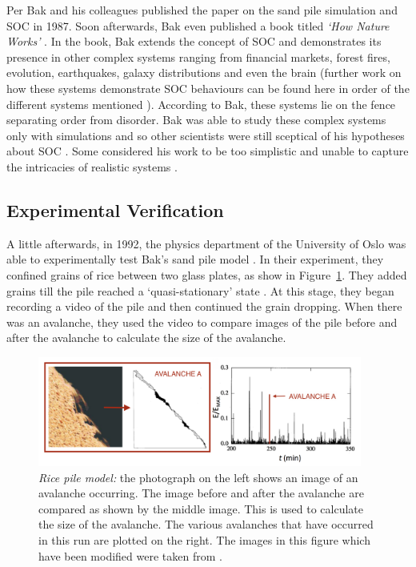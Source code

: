 \documentclass{book}
\begin{document}
Per Bak and his colleagues published the paper on the sand pile simulation and SOC in 1987. Soon afterwards, Bak even published a book titled \textit{`How Nature Works'} \cite{howNatureWorks}. In the book, Bak extends the concept of SOC and demonstrates its presence in other complex systems ranging from financial markets,  forest fires, evolution, earthquakes, galaxy distributions and even the brain \cite{howNatureWorks} (further work on how these systems demonstrate SOC behaviours can be found here in order of the different systems mentioned \cite{stockMarketProof, ForestFireProof,evolutionProof,EarthquakesProof,galaxyFormationProof,BrainProof}). According to Bak, these systems lie on the fence separating order from disorder. Bak was able to study these complex systems only with simulations and so other scientists were still sceptical of his hypotheses about SOC \cite{MindSandWeb}. Some considered his work to be too simplistic and unable to capture the intricacies of realistic systems \cite{MindSandWeb}. 
\subsection{Experimental Verification}
A little afterwards, in 1992, the physics department of the University of Oslo was able to experimentally test Bak's sand pile model \cite{riceExpt}. In their experiment, they confined grains of rice between two glass plates, as show in Figure~\ref{fig:riceModel}. They added grains till the pile reached a `quasi-stationary' state \cite{riceExpt}. At this stage, they began recording a video of the pile and then continued the grain dropping. When there was an avalanche, they used the video to compare images of the pile before and after the avalanche to calculate the size of the avalanche. 
\begin{figure}[h]
	\centering
	\includegraphics[width=0.95\textwidth]{Figures/Intro/riceFigs/riceEvent}
	\caption[Rice-pile Model]{
\textit{Rice pile model:} the photograph on the left shows an image of an avalanche occurring. The image before and after the avalanche are compared as shown by the middle image. This is used to calculate the size of the avalanche. The various avalanches that have occurred in this run are plotted on the right. The images in this figure which have been modified were taken from \cite{riceExpt}. 
}
	\label{fig:riceModel}
\end{figure}
\end{document}
